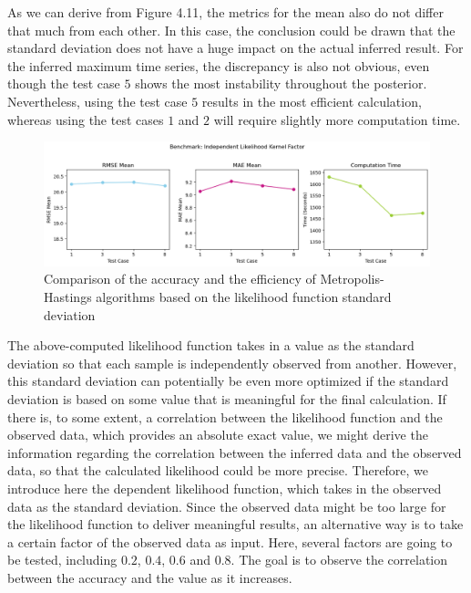 As we can derive from Figure 4.11, the metrics for the mean also do not differ that much from each other. In this case, the conclusion could be drawn that the standard deviation does not have a huge impact on the actual inferred result. For the inferred maximum time series, the discrepancy is also not obvious, even though the test case $5$ shows the most instability throughout the posterior. Nevertheless, using the test case $5$ results in the most efficient calculation, whereas using the test cases $1$ and $2$ will require slightly more computation time.


\begin{figure}[H]
    \centering
    \includegraphics[width=1\textwidth]{figures/basic_mh/benchmark/sensitivity_likelihood_independent.png}
    \captionsetup{width=.8\textwidth}
    \caption{Comparison of the accuracy and the efficiency of Metropolis-Hastings algorithms based on the likelihood function standard deviation}
    \label{fig:enter-label}
\end{figure}



The above-computed likelihood function takes in a value as the standard deviation so that each sample is independently observed from another. However, this standard deviation can potentially be even more optimized if the standard deviation is based on some value that is meaningful for the final calculation. If there is, to some extent, a correlation between the likelihood function and the observed data, which provides an absolute exact value, we might derive the information regarding the correlation between the inferred data and the observed data, so that the calculated likelihood could be more precise. Therefore, we introduce here the dependent likelihood function, which takes in the observed data as the standard deviation. Since the observed data might be too large for the likelihood function to deliver meaningful results, an alternative way is to take a certain factor of the observed data as input. Here, several factors are going to be tested, including $0.2$, $0.4$, $0.6$ and $0.8$. The goal is to observe the correlation between the accuracy and the value as it increases.


